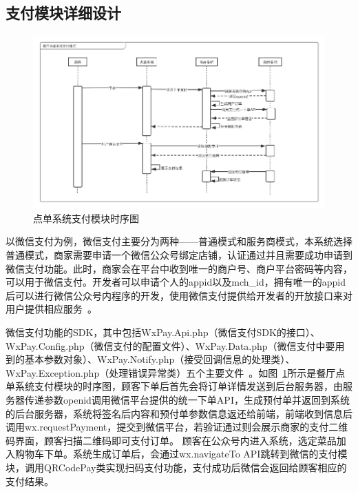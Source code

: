 \subsection{支付模块详细设计}
\begin{figure}[htbp!]
    \centering
    \includegraphics[width=5in]{FIGs/chapter4/pay_time.pdf}
    \caption{点单系统支付模块时序图}\label{fig_pay_time}
\end{figure}

以微信支付为例，微信支付主要分为两种——普通模式和服务商模式，本系统选择普通模式，商家需要申请一个微信公众号绑定店铺，认证通过并且需要成功申请到微信支付功能。此时，商家会在平台中收到唯一的商户号、商户平台密码等内容，可以用于微信支付。开发者可以申请个人的appid以及mch\_id，拥有唯一的appid后可以进行微信公众号内程序的开发，使用微信支付提供给开发者的开放接口来对用户提供相应服务~\cite{fff}。

微信支付功能的SDK，其中包括WxPay.Api.php（微信支付SDK的接口）、WxPay.Config.php（微信支付的配置文件）、WxPay.Data.php（微信支付中要用到的基本参数对象）、WxPay.Notify.php（接受回调信息的处理类）、WxPay.Exception.php（处理错误异常类）五个主要文件~\cite{czz2018}。如图~\ref{fig_pay_time}所示是餐厅点单系统支付模块的时序图，顾客下单后首先会将订单详情发送到后台服务器，由服务器传递参数openid调用微信平台提供的统一下单API，生成预付单并返回到系统的后台服务器，系统将签名后内容和预付单参数信息返还给前端，前端收到信息后调用wx.requestPayment，提交到微信平台，若验证通过则会展示商家的支付二维码界面，顾客扫描二维码即可支付订单。
顾客在公众号内进入系统，选定菜品加入购物车下单。系统生成订单后，会通过wx.navigateTo API跳转到微信的支付模块，调用QRCodePay类实现扫码支付功能，支付成功后微信会返回给顾客相应的支付结果。\\

